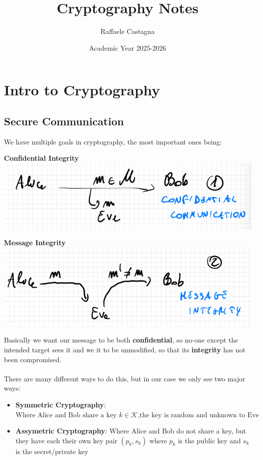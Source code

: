 \documentclass[11pt, a4paper]{article}
\title{Cryptography Notes }
\author{Raffaele Castagna}
\date{Academic Year 2025-2026}
\begin{document}
\maketitle
\tableofcontents
\newpage

\section{Intro to Cryptography}
\label{Intro}
\subsection{Secure Communication}
We have multiple goals in cryptography, the most important ones being:
\begin{center}
    \textbf{Confidential Integrity}
    \includegraphics{img/CF comm.png}
\end{center}
\begin{center}
    \textbf{Message Integrity}
    \includegraphics{img/Msg int.png}
\end{center}
Basically we want our message to be both \textbf{confidential}, so no-one except the intended target sees it and we it to be unmodified, so that its \textbf{integrity} has not been compromised.\\\\
There are many different ways to do this, but in our case we only see two major ways:
\begin{itemize}
    \item \textbf{Symmetric Cryptography}:  $\text{Where Alice and Bob share a key } k \in \mathcal{K} \text{,the key is random and unknown to Eve}$
    \item \textbf{Assymetric Cryptography}: Where Alice and Bob do not share a key, but they have each their own key pair $(p_k,s_k)$ where $p_k$ is the public key and $s_k$ is the secret/private key
\end{itemize}
\end{document}
